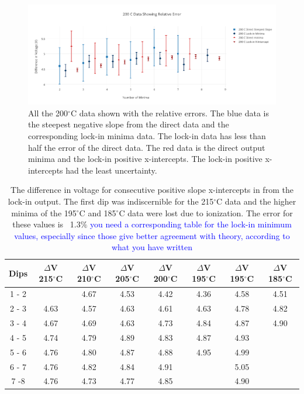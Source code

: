 \documentclass[prb,preprint]{revtex4-1}
\begin{document}
\begin{figure}[h!]
\centering

\includegraphics[width=6in]{rel_error.pdf}
\caption{All the 200$^{\circ}$C data shown with the relative errors. The blue data is the steepest negative slope from the direct data and the corresponding lock-in minima data. The lock-in data has less than half the error of the direct data. The red data is the direct output minima and the lock-in positive x-intercepts. The lock-in positive x-intercepts had the least uncertainty.}

\label{rel_error}
\end{figure}


\begin{table}[h!]
\centering

\caption{The difference in voltage for consecutive positive slope x-intercepts in from the lock-in output. The first dip was indiscernible for the 215$^{\circ}$C data and the higher minima of the 195$^{\circ}$C and 185$^{\circ}$C data were lost due to ionization. The error for these values is ~1.3$\%$ \textcolor{blue}{you need a corresponding table for the lock-in minimum values, especially since those give better agreement with theory, according to what you have written}}

\begin{ruledtabular}
\begin{tabular}{c c c c c c c c}
Dips & $\Delta$V 215$^{\circ}$C & $\Delta$V 210$^{\circ}$C  & $\Delta$V 205$^{\circ}$C &$\Delta$V 200$^{\circ}$C  & $\Delta$V 195$^{\circ}$C  & $\Delta$V 195$^{\circ}$C &$\Delta$V 185$^{\circ}$C  \\
\hline	%
1 - 2 &         & 4.67 & 4.53 & 4.42 & 4.36 & 4.58 & 4.51 \\
2 - 3 & 4.63 & 4.57 & 4.63 & 4.61 & 4.63 & 4.78 & 4.82 \\
3 - 4 & 4.67 & 4.69 & 4.63 & 4.73 & 4.84 & 4.87 & 4.90 \\
4 - 5 & 4.74 & 4.79 & 4.89 & 4.83 & 4.87 & 4.93 &         \\
5 - 6 & 4.76 & 4.80 & 4.87 & 4.88 & 4.95 & 4.99 &         \\
6 - 7 & 4.76 & 4.82 & 4.84 & 4.91 &         & 5.05 &         \\
7 -8  & 4.76 & 4.73 & 4.77 & 4.85 &         & 4.90 &         \\

\end{tabular}
\end{ruledtabular}
\label{hg_lockin_table}
\end{table}
\end{document}
